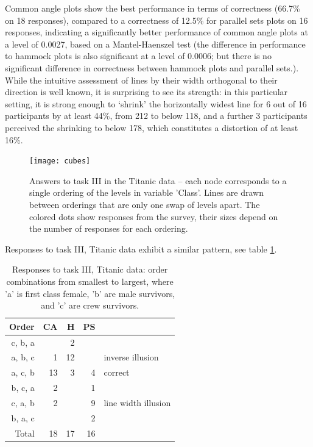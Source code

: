 %
Common angle plots show the best performance in terms of correctness (66.7\% on 18 responses), compared to a correctness of 12.5\% for parallel sets plots on 16 responses, indicating a significantly better performance of common angle plots at a level of 0.0027, based on a Mantel-Haenszel test (the difference in performance to hammock plots is also significant at a level of 0.0006; but there is no significant difference in correctness between hammock plots and parallel sets.).
While the intuitive assessment of lines by their width orthogonal to their direction is well known, it is surprising to see its strength: in this particular setting, it is strong enough to `shrink' the horizontally widest line for 6 out of 16 participants by at least  44\%, from 212 to below 118, and a further 3 participants perceived the shrinking to below 178, which constitutes a distortion of at least 16\%.

\begin{figure}
\texttt{[image: cubes]}
\caption{Answers to task III in the Titanic data -- each node corresponds to a single ordering of the levels in variable 'Class'. Lines are drawn between orderings that are only one swap of levels apart. The colored dots show responses from the survey, their sizes depend on the number of responses for each ordering. }
\label{cubes}
\end{figure}

Responses to task III, Titanic data exhibit a similar pattern, see table \ref{a3}.

\begin{table}[ht]
\begin{center}
\begin{tabular}{rrrrl}
Order & CA & H & PS\\
  \hline
c, b, a &  &  2 &  \\
a, b, c &  1 &  12 &  & inverse illusion\\ 
a, c, b & 13 &  3 &  4 & correct\\ 
b, c, a &  2 &  &  1 \\ 
c, a, b &  2 &  & 9 & line width illusion\\ 
b, a, c &  &  &  2 \\ 
 \hline
  Total & 18 &  17 & 16 \\ 
   \hline
\end{tabular}
\end{center}
\caption{\label{a3}Responses to task III, Titanic data: order combinations from smallest to largest, where 'a' is first class female, 'b' are male survivors, and 'c' are crew survivors. }
\end{table}
  
